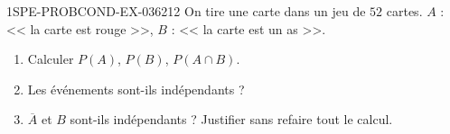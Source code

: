 \begin{exercice}{1SPE-PROBCOND-EX-036}{2}{12}
On tire une carte dans un jeu de $52$ cartes. $A$ : << la carte est rouge >>, $B$ : << la carte est un as >>.

\begin{enumerate}
  \item Calculer $P(A)$, $P(B)$, $P(A \cap B)$.
  \item Les événements sont-ils indépendants ?
  \item $\overline{A}$ et $B$ sont-ils indépendants ? Justifier sans refaire tout le calcul.
\end{enumerate}
\end{exercice}

